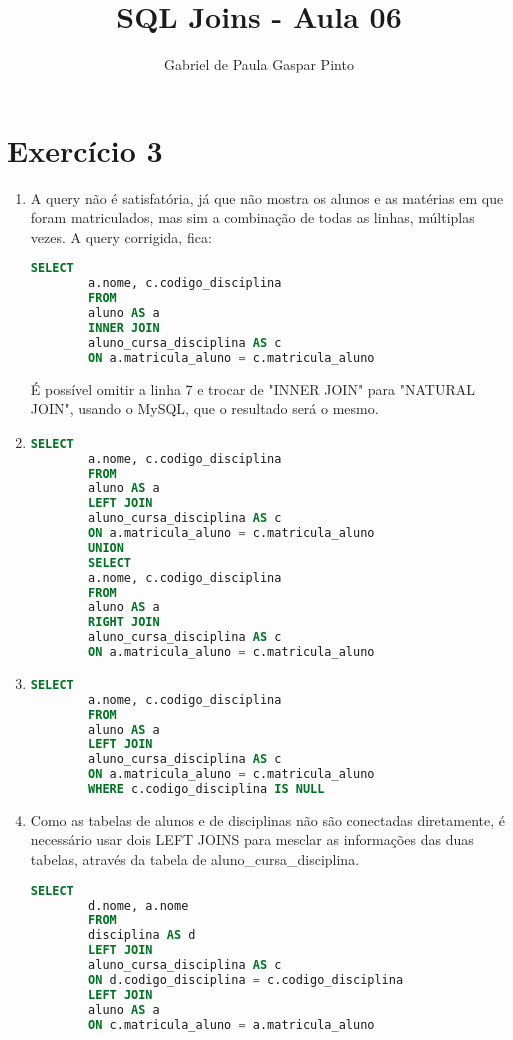 \documentclass{article}
\title{SQL Joins - Aula 06}
\author{Gabriel de Paula Gaspar Pinto}
\date{}
\begin{document}
\maketitle

\section*{Exercício 3}

\begin{enumerate}[label=\alph*)]

    \item A query não é satisfatória, já que não mostra os alunos e as matérias em que foram matriculados, mas sim a combinação de todas as linhas, múltiplas vezes. A query corrigida, fica:

    \begin{lstlisting}[language=SQL]
        SELECT
        a.nome, c.codigo_disciplina
        FROM
        aluno AS a
        INNER JOIN
        aluno_cursa_disciplina AS c
        ON a.matricula_aluno = c.matricula_aluno
    \end{lstlisting}

    É possível omitir a linha 7 e trocar de "INNER JOIN" para "NATURAL JOIN", usando o MySQL, que o resultado será o mesmo.

    \item 
    \begin{lstlisting}[language=SQL]
        SELECT
        a.nome, c.codigo_disciplina
        FROM
        aluno AS a
        LEFT JOIN
        aluno_cursa_disciplina AS c
        ON a.matricula_aluno = c.matricula_aluno
        UNION
        SELECT
        a.nome, c.codigo_disciplina
        FROM
        aluno AS a
        RIGHT JOIN
        aluno_cursa_disciplina AS c
        ON a.matricula_aluno = c.matricula_aluno
    \end{lstlisting}

    \item
    \begin{lstlisting}[language=SQL]
        SELECT
        a.nome, c.codigo_disciplina
        FROM
        aluno AS a
        LEFT JOIN
        aluno_cursa_disciplina AS c
        ON a.matricula_aluno = c.matricula_aluno
        WHERE c.codigo_disciplina IS NULL
    \end{lstlisting}

    \item Como as tabelas de alunos e de disciplinas não são conectadas diretamente, é necessário usar dois LEFT JOINS para mesclar as informações das duas tabelas, através da tabela de aluno\_cursa\_disciplina.
    \begin{lstlisting}[language=SQL]
        SELECT
        d.nome, a.nome
        FROM
        disciplina AS d
        LEFT JOIN
        aluno_cursa_disciplina AS c
        ON d.codigo_disciplina = c.codigo_disciplina
        LEFT JOIN
        aluno AS a
        ON c.matricula_aluno = a.matricula_aluno
    \end{lstlisting}


\end{enumerate}
\end{document}
